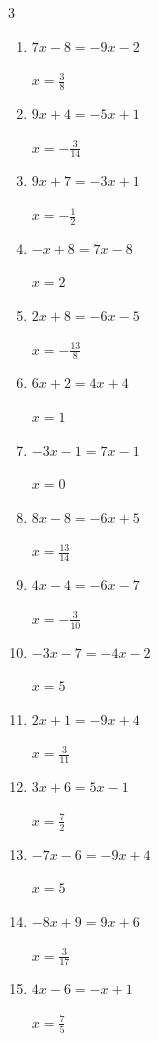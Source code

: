 \begin{multicols}{3}
\begin{enumerate}
  \item $7x-8=-9x-2$

        $\displaystyle x=\frac{3}{8}$

  \item $9x+4=-5x+1$

        $\displaystyle x=-\frac{3}{14}$

  \item $9x+7=-3x+1$

        $\displaystyle x=-\frac{1}{2}$

  \item $-x+8=7x-8$

        $\displaystyle x=2$

  \item $2x+8=-6x-5$

        $\displaystyle x=-\frac{13}{8}$

  \item $6x+2=4x+4$

        $\displaystyle x=1$

  \item $-3x-1=7x-1$

        $\displaystyle x=0$

  \item $8x-8=-6x+5$

        $\displaystyle x=\frac{13}{14}$

  \item $4x-4=-6x-7$

        $\displaystyle x=-\frac{3}{10}$

  \item $-3x-7=-4x-2$

        $\displaystyle x=5$

  \item $2x+1=-9x+4$

        $\displaystyle x=\frac{3}{11}$

  \item $3x+6=5x-1$

        $\displaystyle x=\frac{7}{2}$

  \item $-7x-6=-9x+4$

        $\displaystyle x=5$

  \item $-8x+9=9x+6$

        $\displaystyle x=\frac{3}{17}$

  \item $4x-6=-x+1$

        $\displaystyle x=\frac{7}{5}$


\end{enumerate}
\end{multicols}
